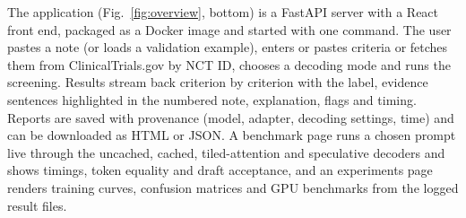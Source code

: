 The application (Fig.~\ref{fig:overview}, bottom) is a FastAPI server with a React front end,
packaged as a Docker image and started with one command. The user pastes a note (or loads a
validation example), enters or pastes criteria or fetches them from ClinicalTrials.gov by NCT ID,
chooses a decoding mode and runs the screening. Results stream back criterion by criterion with the
label, evidence sentences highlighted in the numbered note, explanation, flags and timing. Reports are
saved with provenance (model, adapter, decoding settings, time) and can be downloaded as HTML or JSON.
A benchmark page runs a chosen prompt live through the uncached, cached, tiled-attention and
speculative decoders and shows timings, token equality and draft acceptance, and an experiments page
renders training curves, confusion matrices and GPU benchmarks from the logged result files.
